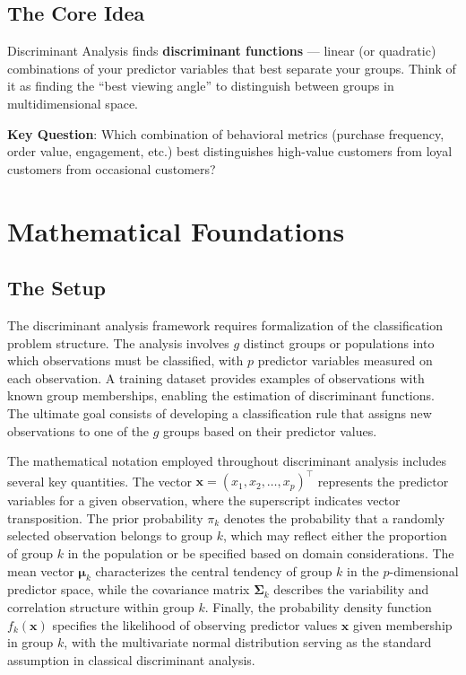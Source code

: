 \documentclass[
]{article}
\begin{document}
\subsection{The Core Idea}

Discriminant Analysis finds \textbf{discriminant functions} --- linear
(or quadratic) combinations of your predictor variables that best
separate your groups. Think of it as finding the ``best viewing angle''
to distinguish between groups in multidimensional space.

\textbf{Key Question}: Which combination of behavioral metrics (purchase
frequency, order value, engagement, etc.) best distinguishes high-value
customers from loyal customers from occasional customers?

\section{Mathematical Foundations}

\subsection{The Setup}

The discriminant analysis framework requires formalization of the
classification problem structure. The analysis involves \(g\) distinct
groups or populations into which observations must be classified, with
\(p\) predictor variables measured on each observation. A training
dataset provides examples of observations with known group memberships,
enabling the estimation of discriminant functions. The ultimate goal
consists of developing a classification rule that assigns new
observations to one of the \(g\) groups based on their predictor values.

The mathematical notation employed throughout discriminant analysis
includes several key quantities. The vector
\(\mathbf{x} = \left( x_{1},x_{2},\ldots,x_{p} \right)^{\top}\)
represents the predictor variables for a given observation, where the
superscript indicates vector transposition. The prior probability
\(\pi_{k}\) denotes the probability that a randomly selected observation
belongs to group \(k\), which may reflect either the proportion of group
\(k\) in the population or be specified based on domain considerations.
The mean vector \(\mathbf{\mu}_{k}\) characterizes the central tendency
of group \(k\) in the \(p\)-dimensional predictor space, while the
covariance matrix \(\mathbf{\Sigma}_{k}\) describes the variability and
correlation structure within group \(k\). Finally, the probability
density function \(f_{k}\left( \mathbf{x} \right)\) specifies the
likelihood of observing predictor values \(\mathbf{x}\) given membership
in group \(k\), with the multivariate normal distribution serving as the
standard assumption in classical discriminant analysis.
\end{document}
